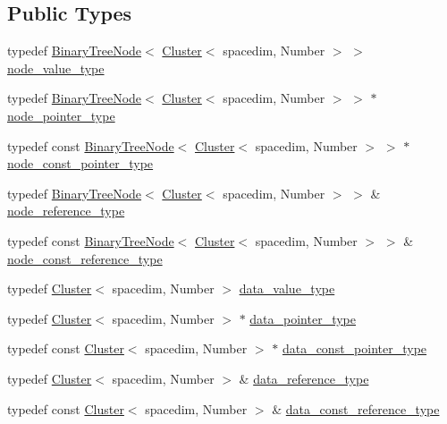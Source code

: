 \subsection*{Public Types}
\begin{DoxyCompactItemize}
\item 
typedef \hyperlink{classBinaryTreeNode}{Binary\+Tree\+Node}$<$ \hyperlink{classCluster}{Cluster}$<$ spacedim, Number $>$ $>$ \hyperlink{classClusterTree_ab12442ec2508818e1663df6c5a137b05}{node\+\_\+value\+\_\+type}
\item 
typedef \hyperlink{classBinaryTreeNode}{Binary\+Tree\+Node}$<$ \hyperlink{classCluster}{Cluster}$<$ spacedim, Number $>$ $>$ $\ast$ \hyperlink{classClusterTree_ae4bb0fdc7ac559d7844d04a00ab3e9de}{node\+\_\+pointer\+\_\+type}
\item 
typedef const \hyperlink{classBinaryTreeNode}{Binary\+Tree\+Node}$<$ \hyperlink{classCluster}{Cluster}$<$ spacedim, Number $>$ $>$ $\ast$ \hyperlink{classClusterTree_acb805fbc20c01a71fa6a00adc959542c}{node\+\_\+const\+\_\+pointer\+\_\+type}
\item 
typedef \hyperlink{classBinaryTreeNode}{Binary\+Tree\+Node}$<$ \hyperlink{classCluster}{Cluster}$<$ spacedim, Number $>$ $>$ \& \hyperlink{classClusterTree_a257ebe4c6eab6581a0b65ba62487ae2c}{node\+\_\+reference\+\_\+type}
\item 
typedef const \hyperlink{classBinaryTreeNode}{Binary\+Tree\+Node}$<$ \hyperlink{classCluster}{Cluster}$<$ spacedim, Number $>$ $>$ \& \hyperlink{classClusterTree_ac40955dbfdb9b0beec67a0ecf6810c8f}{node\+\_\+const\+\_\+reference\+\_\+type}
\item 
typedef \hyperlink{classCluster}{Cluster}$<$ spacedim, Number $>$ \hyperlink{classClusterTree_ab7875a0c5ba927d1d3c5f5212d1d524d}{data\+\_\+value\+\_\+type}
\item 
typedef \hyperlink{classCluster}{Cluster}$<$ spacedim, Number $>$ $\ast$ \hyperlink{classClusterTree_a87fee1708c95c5575fce3029b79d32a8}{data\+\_\+pointer\+\_\+type}
\item 
typedef const \hyperlink{classCluster}{Cluster}$<$ spacedim, Number $>$ $\ast$ \hyperlink{classClusterTree_ac425245d60967a91905245003e5d46b1}{data\+\_\+const\+\_\+pointer\+\_\+type}
\item 
typedef \hyperlink{classCluster}{Cluster}$<$ spacedim, Number $>$ \& \hyperlink{classClusterTree_ae47bb5a21c1468972b1c2ede0e8aa28c}{data\+\_\+reference\+\_\+type}
\item 
typedef const \hyperlink{classCluster}{Cluster}$<$ spacedim, Number $>$ \& \hyperlink{classClusterTree_a1d171cbb6b0a8367b4be0d2b87bc9ba8}{data\+\_\+const\+\_\+reference\+\_\+type}
\end{DoxyCompactItemize}

